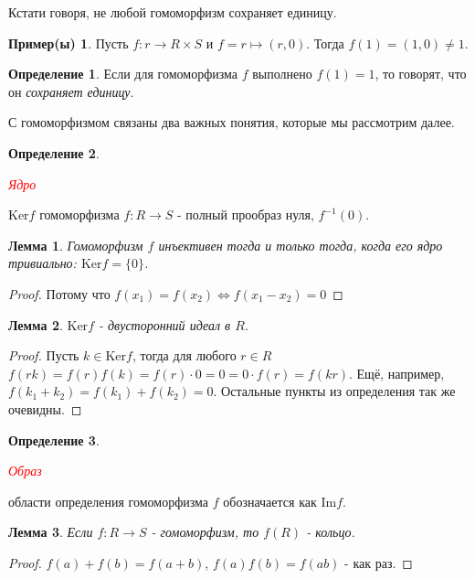\documentclass[a4paper,100pt]{article}
\theoremstyle{indented}
\newtheorem{lemma}{Лемма}
\theoremstyle{definition}
\newtheorem{defn}{Определение}
\newtheorem{exl}{Пример(ы)}
\theoremstyle{remark}
\begin{document}
Кстати говоря, не любой гомоморфизм сохраняет единицу.

\begin{exl}
    Пусть $f:r\rightarrow R\times S$ и $f=r\mapsto (r,0)$. Тогда $f(1)=(1,0)\neq 1$.
\end{exl}

\begin{defn}
    Если для гомоморфизма $f$ выполнено $f(1)=1$, то говорят, что он \textit{сохраняет единицу}.
\end{defn}

С гомоморфизмом связаны два важных понятия, которые мы рассмотрим далее.

\begin{defn}
    \hypertarget{n20}{\textcolor{red}{\textit{Ядро}}} $\text{Ker}f$ гомоморфизма $f:R\rightarrow S$ - полный прообраз нуля, $f^{-1}(0)$.
\end{defn}

\begin{lemma}
    Гомоморфизм $f$ инъективен тогда и только тогда, когда его ядро тривиально: $\text{Ker}f=\{0\}$.
\end{lemma}

\begin{proof}
    Потому что $f(x_1)=f(x_2)\Longleftrightarrow f(x_1-x_2)=0$
\end{proof}

\begin{lemma}
    $\text{Ker}f$ - двусторонний идеал в $R$.
\end{lemma}

\begin{proof}
    Пусть $k\in \text{Ker}f$, тогда для любого $r\in R$ $f(rk)=f(r)f(k)=f(r)\cdot 0 = 0 = 0\cdot f(r)=f(kr)$. Ещё, например, $f(k_1+k_2)=f(k_1)+f(k_2)=0$. Остальные пункты из определения так же очевидны.
\end{proof}

\begin{defn}
    \hypertarget{n21}{\textcolor{red}{\textit{Образ}}} области определения гомоморфизма $f$ обозначается как $\text{Im}f$.
\end{defn}

\begin{lemma}
    Если $f:R\rightarrow S$ - гомоморфизм, то $f(R)$ - кольцо.
\end{lemma}

\begin{proof}
    $f(a)+f(b)=f(a+b)$, $f(a)f(b)=f(ab)$ - как раз.
\end{proof}
\end{document}
